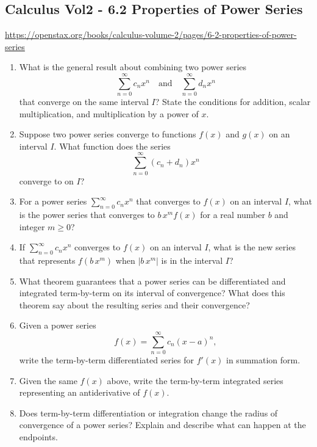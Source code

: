 \subsection{Calculus Vol2 - 6.2 Properties of Power Series}

\url{https://openstax.org/books/calculus-volume-2/pages/6-2-properties-of-power-series}

\begin{enumerate}

\item What is the general result about combining two power series
  \[
    \sum_{n=0}^{\infty}c_nx^n\quad\text{and}\quad\sum_{n=0}^{\infty}d_nx^n
  \]
  that converge on the same interval \(I\)? State the conditions for addition, scalar multiplication, and multiplication by a power of \(x\).

\item Suppose two power series converge to functions \(f(x)\) and \(g(x)\) on an interval \(I\). What function does the series
  \[
    \sum_{n=0}^{\infty}(c_n+d_n)x^n
  \]
  converge to on \(I\)?

\item For a power series \(\sum_{n=0}^{\infty}c_nx^n\) that converges to \(f(x)\) on an interval \(I\), what is the power series that converges to \(b\,x^m f(x)\) for a real number \(b\) and integer \(m\ge0\)?

\item If \(\sum_{n=0}^{\infty}c_nx^n\) converges to \(f(x)\) on an interval \(I\), what is the new series that represents \(f(b\,x^m)\) when \(|b\,x^m|\) is in the interval \(I\)?

\item What theorem guarantees that a power series can be differentiated and integrated term-by-term on its interval of convergence? What does this theorem say about the resulting series and their convergence?

\item Given a power series
  \[
    f(x)=\sum_{n=0}^{\infty}c_n(x-a)^n,
  \]
  write the term-by-term differentiated series for \(f'(x)\) in summation form.

\item Given the same \(f(x)\) above, write the term-by-term integrated series representing an antiderivative of \(f(x)\).

\item Does term-by-term differentiation or integration change the radius of convergence of a power series? Explain and describe what can happen at the endpoints.


\end{enumerate}

